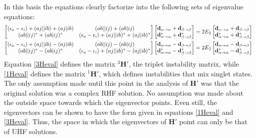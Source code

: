 \documentclass{revtex4}
\newcommand{\Ap}{\textcolor{myred}{\left(aj|ib\right)}}
\newcommand{\Aa}{\textcolor{myred}{\left(aj||ib\right)}}
\newcommand{\B}{\textcolor{myblue}{\left(ab|ij\right)}}
\newcommand{\Ba}{\textcolor{myblue}{\left(ab||ij\right)}}
\newcommand{\AtoA}{\mathbf{\alpha\rightarrow\alpha}}
\newcommand{\BtoB}{\mathbf{\beta\rightarrow\beta}}
\newcommand{\e}{\textcolor{myred}{\left(\epsilon_a-\epsilon_i\right)}}
\begin{document}
In this basis the equations clearly factorize into the following sets of eigenvalue equations:  
\begin{eqnarray}\label{1Heval}
  \begin{bmatrix}
    \e + \Aa + \Ap & \Ba + \B          \\
    \Ba^* + \B^*   & \e+ \Aa^* + \Ap^* \\
  \end{bmatrix}
  \begin{bmatrix}
    \mathbf{d_\AtoA + d_\BtoB} \\
    \mathbf{d^*_\AtoA + d^*_\BtoB} \\        
  \end{bmatrix}
  = 2E_2
  \begin{bmatrix}
    \mathbf{d_\AtoA + d_\BtoB} \\
    \mathbf{d^*_\AtoA + d^*_\BtoB} \\        
  \end{bmatrix}
  \vspace{5mm}
  \\ \label{3Heval}
  \begin{bmatrix}
    \e + \Aa - \Ap & \Ba - \B          \\
    \Ba^* - \B^*   & \e+ \Aa^* - \Ap^* \\
  \end{bmatrix}
  \begin{bmatrix}
    \mathbf{d_\AtoA - d_\BtoB} \\
    \mathbf{d^*_\AtoA - d^*_\BtoB} \\        
  \end{bmatrix}
  = 2E_2
  \begin{bmatrix}
    \mathbf{d_\AtoA - d_\BtoB} \\
    \mathbf{d^*_\AtoA - d^*_\BtoB} \\        
  \end{bmatrix}
\end{eqnarray}
Equation \ref{3Heval} defines the matrix ${{}^3\mathbf{H}'}$, the triplet instability matrix,
while \ref{1Heval} defines the matrix ${{}^1\mathbf{H}'}$, which defines instabilities that mix 
singlet states. The only assumption made until this point in the analysis of ${\mathbf{H}'}$ was
that the original solution was a complex RHF solution. No assumption was made about the outside 
space towards which the eigenvector points. Even still, the eigenvectors can be shown to have the
form given in equations \ref{1Heval} and \ref{3Heval}. Thus, the space in which the eigenvectors
of ${\mathbf{H}'}$ point can only be that of UHF solutions. 
\end{document}
